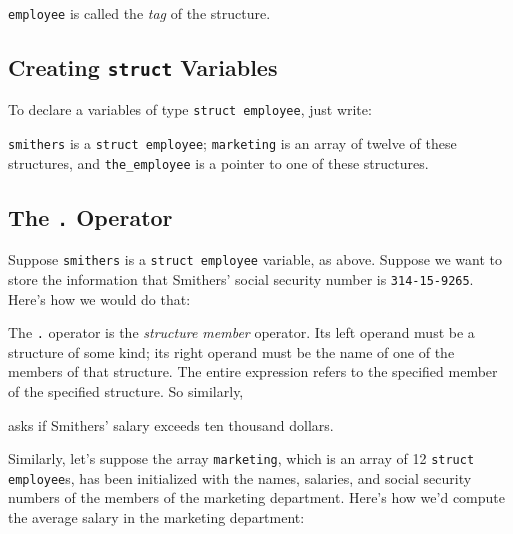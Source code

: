 {\tt employee} is called the {\em tag}\/ of the structure.

\subsection{Creating {\tt struct} Variables}

To declare a variables of type {\tt struct employee}, just write:

\begin{flushleft}
\verb% struct employee smithers, marketing[12], *the_employee;% 
\end{flushleft}

{\tt smithers} is a {\tt struct employee}; {\tt marketing} is an array
of twelve of these structures, and {\tt the\_employee} is a pointer to
one of these structures.

\subsection{The {\tt .} Operator}

Suppose {\tt smithers} is a {\tt struct employee} variable, as above.
Suppose we want to store the information that Smithers' social security
number is {\tt 314-15-9265}.  Here's how we would do that:

\begin{flushleft}
\verb% smithers.ssn = 314159265; %
\end{flushleft}

The {\tt .} operator is the {\em structure member}\/ operator.  Its left
operand must be a structure of some kind; its right operand must be the
name of one of the members of that structure.  The entire expression
refers to the specified member of the specified structure.  So
similarly,

\begin{flushleft}
\verb% if ( smithers.salary > 10000 ) %  \\*
\verb%   ... % 
\end{flushleft}

\noindent asks if Smithers' salary exceeds ten thousand dollars. 

Similarly, let's suppose the array {\tt marketing}, which is an array of
12 {\tt struct employee}s, has been initialized with the names,
salaries, and social security numbers of the members of the marketing
department.  Here's how we'd compute the average salary in the marketing
department:  


